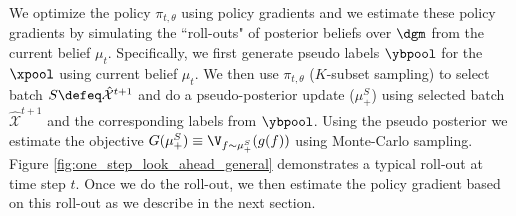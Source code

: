 We optimize the policy $\pi_{t,\theta}$ using policy gradients and we estimate these policy gradients by  simulating the ``roll-outs" of posterior beliefs over $\dgm$ from the current belief $\mu_t$. Specifically, we first generate pseudo labels $\ybpool$ for the $\xpool$ using current belief $\mu_t$. We then use $\pi_{t,\theta}$ ($K$-subset sampling) to select batch $S\defeq\hat{\mathcal{X}}^{t+1}$ and do a pseudo-posterior update ($\mu_{+}^S$) using selected batch $\hat{\mathcal{X}}^{t+1}$ and the corresponding labels from $\ybpool$. Using the pseudo posterior  we estimate the objective $ G(\mu_{+}^S) \equiv \V_{f\sim\mu_{+}^S} (g(f))$ using Monte-Carlo sampling. 
 Figure \ref{fig:one_step_look_ahead_general} demonstrates a typical roll-out at time step $t$. Once we do the roll-out, we then estimate the policy gradient based on this roll-out as we describe in the next section. 

